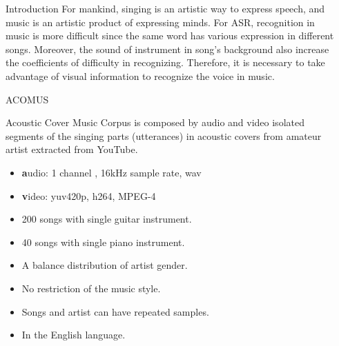 \documentclass[final]{beamer}
\newlength{\sepwid}
\newlength{\onecolwid}
\begin{document}
\begin{frame}[t]
\begin{columns}[t]
\begin{column}{\onecolwid}
\begin{block}{Introduction}
For mankind, singing is an artistic way to express speech, and music is an artistic product of expressing minds. For ASR, recognition in music is more difficult since the same word has various expression in different songs. Moreover, the sound of instrument in song's background also increase the coefficients of difficulty in recognizing. Therefore, it is necessary to take advantage of visual information to recognize the voice in music.





\end{block}

\begin{alertblock}{ACOMUS}

Acoustic Cover Music Corpus\cite{corpus} is composed by audio and video isolated segments of the singing parts (utterances) in acoustic covers from amateur artist extracted from YouTube.
\begin{itemize}
\item \textbf audio: 1 channel , 16kHz sample rate, wav
\item \textbf video: yuv420p, h264, MPEG-4
\item 200 songs with single guitar instrument.
\item 40 songs with single piano instrument.
\item A balance distribution of artist gender.
\item No restriction of the music style.
\item Songs and artist can have repeated samples.
\item In the English language.
\end{itemize}


\end{alertblock}





\end{column} %

\begin{column}{\sepwid}\end{column} %


\end{columns}
\end{frame}
\end{document}
